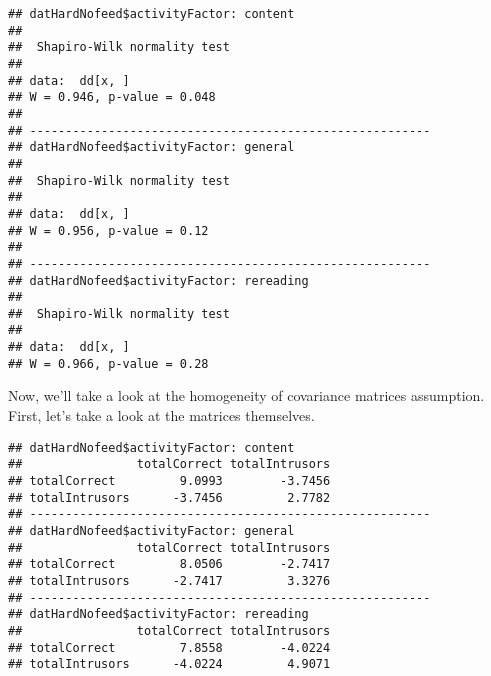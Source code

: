 \documentclass[12pt,]{article}
\newenvironment{Shaded}{\begin{snugshade}}{\end{snugshade}}
\newcommand{\DataTypeTok}[1]{\textcolor[rgb]{0.13,0.29,0.53}{#1}}
\newcommand{\KeywordTok}[1]{\textcolor[rgb]{0.13,0.29,0.53}{\textbf{#1}}}
\newcommand{\NormalTok}[1]{#1}
\newcommand{\OperatorTok}[1]{\textcolor[rgb]{0.81,0.36,0.00}{\textbf{#1}}}
\newcommand{\StringTok}[1]{\textcolor[rgb]{0.31,0.60,0.02}{#1}}
\begin{document}
\begin{Shaded}
\end{Shaded}

\begin{verbatim}
## datHardNofeed$activityFactor: content
## 
##  Shapiro-Wilk normality test
## 
## data:  dd[x, ]
## W = 0.946, p-value = 0.048
## 
## -------------------------------------------------------- 
## datHardNofeed$activityFactor: general
## 
##  Shapiro-Wilk normality test
## 
## data:  dd[x, ]
## W = 0.956, p-value = 0.12
## 
## -------------------------------------------------------- 
## datHardNofeed$activityFactor: rereading
## 
##  Shapiro-Wilk normality test
## 
## data:  dd[x, ]
## W = 0.966, p-value = 0.28
\end{verbatim}

Now, we'll take a look at the homogeneity of covariance matrices
assumption. First, let's take a look at the matrices themselves.

\begin{Shaded}
\end{Shaded}

\begin{verbatim}
## datHardNofeed$activityFactor: content
##                totalCorrect totalIntrusors
## totalCorrect         9.0993        -3.7456
## totalIntrusors      -3.7456         2.7782
## -------------------------------------------------------- 
## datHardNofeed$activityFactor: general
##                totalCorrect totalIntrusors
## totalCorrect         8.0506        -2.7417
## totalIntrusors      -2.7417         3.3276
## -------------------------------------------------------- 
## datHardNofeed$activityFactor: rereading
##                totalCorrect totalIntrusors
## totalCorrect         7.8558        -4.0224
## totalIntrusors      -4.0224         4.9071
\end{verbatim}
\end{document}
